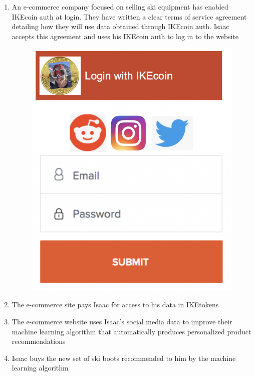\documentclass[12pt, letterpaper, twoside]{article}
\begin{document}
\begin{enumerate}
\item An e-commerce company focused on selling ski equipment has enabled IKEcoin auth at login. They have written a clear terms of service agreement detailing how they will use data obtained through IKEcoin auth. Isaac accepts this agreement and uses his IKEcoin auth to log in to the website 
\begin{figure}[h]
\includegraphics[scale=0.3]{media/IKEcoinLogin.jpg}
\centering
\end{figure}
    
\item The e-commerce site pays Isaac for access to his data  in IKEtokens
    
\item The e-commerce website uses Isaac's social media data to improve their machine learning algorithm that automatically produces personalized product recommendations 
    
\item Isaac buys the new set of ski boots recommended to him by the machine learning algorithm    
\end{enumerate}
\end{document}
